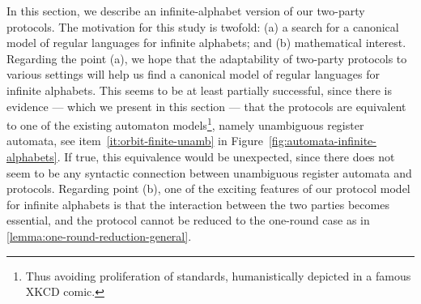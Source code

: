 In this section, we describe an infinite-alphabet version of our two-party
protocols. The motivation for this study is twofold: (a) a search for a
canonical model of regular languages for infinite alphabets; and (b)
mathematical interest. Regarding the point (a), we hope that the adaptability
of two-party protocols to various settings will help us  find a canonical model
of regular languages for infinite alphabets. This seems to be at least
partially successful, since there is evidence --- which we present in this
section --- that the protocols are equivalent to one of the existing automaton
models\footnote{
  Thus avoiding proliferation of standards, humanistically depicted in a famous XKCD comic.
}, namely unambiguous register automata, see item~\ref{it:orbit-finite-unamb} in
Figure~\ref{fig:automata-infinite-alphabets}. If true, this
equivalence would be unexpected, since there does not seem to be any syntactic
connection between unambiguous register automata and protocols. Regarding point
(b), one of the exciting features of our protocol model for infinite alphabets
is that the interaction between the two parties becomes essential, and the
protocol cannot be reduced to the one-round case as in
\cref{lemma:one-round-reduction-general}.

